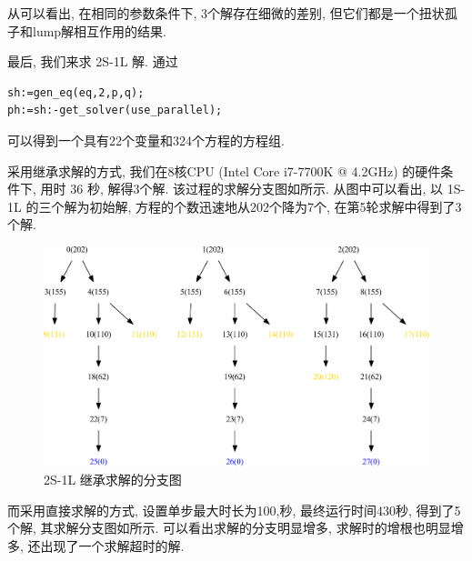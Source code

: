 从可以看出, 在相同的参数条件下, 3个解存在细微的差别, 但它们都是一个扭状孤子和lump解相互作用的结果. 

最后, 我们来求 2S-1L 解. 通过
\begin{verbatim}
sh:=gen_eq(eq,2,p,q);
ph:=sh:-get_solver(use_parallel);
\end{verbatim}
可以得到一个具有22个变量和324个方程的方程组. 

采用继承求解的方式, 我们在8核CPU (Intel Core i7-7700K @ 4.2GHz) 的硬件条件下, 用时 36 秒, 解得3个解. 该过程的求解分支图如所示. 从图中可以看出, 以 1S-1L 的三个解为初始解, 方程的个数迅速地从202个降为7个, 在第5轮求解中得到了3个解. 

\begin{figure}[htbp]
\centering
\includegraphics[width=\textwidth]{fig/2S1L-ext.pdf}
\caption{2S-1L 继承求解的分支图}\label{sb2-e}
\end{figure}

而采用直接求解的方式, 设置单步最大时长为100,秒, 最终运行时间430秒, 得到了5个解, 其求解分支图如所示. 可以看出求解的分支明显增多, 求解时的增根也明显增多, 还出现了一个求解超时的解.  

